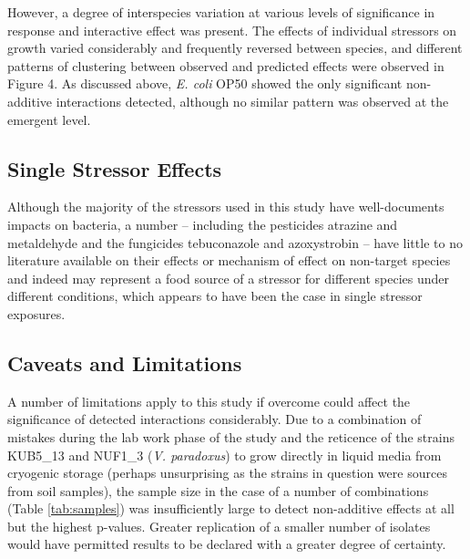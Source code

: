 \documentclass[review,12pt]{elsarticle}
\begin{document}
However, a degree of interspecies variation at various levels of significance in response and interactive effect was present. The effects of individual stressors on growth varied considerably and frequently reversed between species, and different patterns of clustering between observed and predicted effects were observed in Figure 4. As discussed above, \textit{E. coli} OP50 showed the only significant non-additive interactions detected, although no similar pattern was observed at the emergent level. 

\subsection{Single Stressor Effects}
\label{S:4:2}

Although the majority of the stressors used in this study have well-documents impacts on bacteria, a number – including the pesticides atrazine and metaldehyde and the fungicides tebuconazole and azoxystrobin – have little to no literature available on their effects or mechanism of effect on non-target species and indeed may represent a food source of a stressor for different species under different conditions, which appears to have been the case in single stressor exposures.

\subsection{Caveats and Limitations}
\label{S:4:3}

A number of limitations apply to this study if overcome could affect the significance of detected interactions considerably.  Due to a combination of mistakes during the lab work phase of the study and the reticence of the strains KUB5\_13 and NUF1\_3 (\textit{V. paradoxus}) to grow directly in liquid media from cryogenic storage (perhaps unsurprising as the strains in question were sources from soil samples), the sample size in the case of a number of combinations (Table \ref{tab:samples}) was insufficiently large to detect non-additive effects at all but the highest p-values.  Greater replication of a smaller number of isolates would have permitted results to be declared with a greater degree of certainty. 
\end{document}
